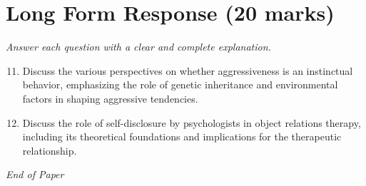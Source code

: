 \documentclass[12pt]{article}
\begin{document}
\section*{Long Form Response (20 marks)}
\textit{Answer each question with a clear and complete explanation.}
\begin{enumerate}[label=\arabic*.]
\setcounter{enumi}{10}
\item Discuss the various perspectives on whether aggressiveness is an instinctual behavior, emphasizing the role of genetic inheritance and environmental factors in shaping aggressive tendencies.
\item Discuss the role of self-disclosure by psychologists in object relations therapy, including its theoretical foundations and implications for the therapeutic relationship.
\end{enumerate}

\vfill
\noindent\textit{End of Paper}
\end{document}
